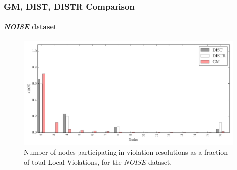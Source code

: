 \documentclass[hyperref={pdfpagelabels=false}]{beamer}
\begin{document}
\begin{frame} \frametitle{GM, DIST, DISTR Comparison}\framesubtitle{\emph{NOISE} dataset}
\begin{figure}
\vspace{-0.2cm}
\centering
\includegraphics[scale=0.4]{../img/matchings_matchings_noisyinterweaving.pdf}
  \caption{Number of nodes participating in violation resolutions as a fraction of total Local Violations, for the \emph{NOISE} dataset.}
\end{figure}
\end{frame}
\end{document}
